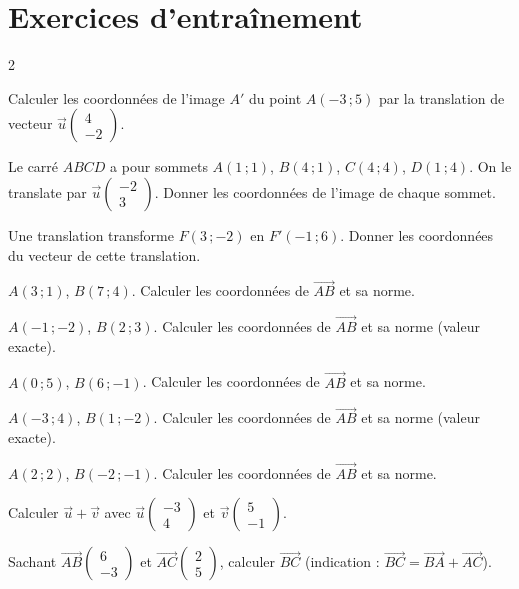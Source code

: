 \section{Exercices d'entraînement}
\begin{multicols}{2}

\exo{} Calculer les coordonnées de l'image $A'$ du point $A(-3\,;5)$ par la
translation de vecteur $\vec u\begin{pmatrix}4\\-2\end{pmatrix}$.

\exo{} Le carré $ABCD$ a pour sommets $A(1\,;1)$, $B(4\,;1)$, $C(4\,;4)$,
$D(1\,;4)$. On le translate par $\vec u\begin{pmatrix}-2\\3\end{pmatrix}$. Donner les
coordonnées de l'image de chaque sommet.

\exo{} Une translation transforme $F(3\,;-2)$ en $F'(-1\,;6)$. Donner les
coordonnées du vecteur de cette translation.

\exo{} $A(3\,;1)$, $B(7\,;4)$. Calculer les coordonnées de $\vec{AB}$ et sa norme.

\exo{} $A(-1\,;-2)$, $B(2\,;3)$. Calculer les coordonnées de $\vec{AB}$ et sa
norme (valeur exacte).

\exo{} $A(0\,;5)$, $B(6\,;-1)$. Calculer les coordonnées de $\vec{AB}$ et sa norme.

\exo{} $A(-3\,;4)$, $B(1\,;-2)$. Calculer les coordonnées de $\vec{AB}$ et sa
norme (valeur exacte).

\exo{} $A(2\,;2)$, $B(-2\,;-1)$. Calculer les coordonnées de $\vec{AB}$ et sa
norme.

\exo{} Calculer $\vec u+\vec v$ avec $\vec u\begin{pmatrix}-3\\4\end{pmatrix}$ et
$\vec v\begin{pmatrix}5\\-1\end{pmatrix}$.

\exo{} Sachant $\vec{AB}\begin{pmatrix}6\\-3\end{pmatrix}$ et
$\vec{AC}\begin{pmatrix}2\\5\end{pmatrix}$, calculer $\vec{BC}$ (indication :
$\vec{BC}=\vec{BA}+\vec{AC}$).


\end{multicols}
